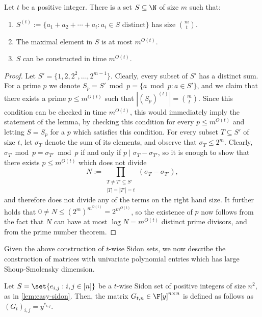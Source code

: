 \begin{lemma}\label{lem:easy-sidon}
Let $t$ be a positive integer. There is a set $S\subseteq\N$ of size $m$ such that:
\begin{enumerate}
\item $S^{(t)}:=\{a_1+a_2+\cdots+a_t:a_i\in S\text{ distinct}\}$ has size $\binom mt$.
\item The maximal element in $S$ is at most $m^{O(t)}$.
\item $S$ can be constructed in time $m^{O(t)}$.
\end{enumerate}
\end{lemma}
\begin{proof}
Let $S'=\{1,2,2^2,\ldots,2^{m-1}\}$. Clearly, every subset of $S'$ has a distinct sum. For a prime $p$ we denote $S_p=S'\bmod p=\{a\bmod p:a\in S'\}$, and we claim that there exists a prime $p\le m^{O(t)}$ such that $|(S_p)^{(t)}|=\binom mt$. Since this condition can be checked in time $m^{O(t)}$, this would immediately imply the statement of the lemma, by checking this condition for every $p\le m^{O(t)}$ and letting $S=S_p$ for a $p$ which satisfies this condition.
For every subset $T\subseteq S'$ of size $t$, let $\sigma_T$ denote the sum of its elements, and observe that $\sigma_T\le2^m$. Clearly, $\sigma_T\bmod p=\sigma_{T'}\bmod p$ if and only if $p\mid\sigma_T-\sigma_{T'}$, so it is enough to show that there exists $p\le m^{O(t)}$ which does not divide
\[N:=\prod_{\substack{T\ne T'\subseteq S'\\|T|=|T'|=t}}(\sigma_T-\sigma_{T'}),\]
and therefore does not divide any of the terms on the right hand size. It further holds that $0\ne N\le(2^m)^{m^{O(t)}}=2^{m^{O(t)}}$, so the existence of $p$ now follows from the fact that $N$ can have at most $\log N=m^{O(t)}$ distinct prime divisors, and from the prime number theorem.
\end{proof}

Given the above construction of $t$-wise Sidon sets, we now describe the construction of matrices with univariate polynomial entries which has large Shoup-Smolensky dimension.

\begin{construction}
\label{con:univariate hard matrix}
Let $S = \set{e_{i, j} : i, j \in [n]}$ be a $t$-wise Sidon set of positive integers of size $n^2$, as in \autoref{lem:easy-sidon}. Then, the matrix $G_{t,n} \in \F[y]^{n \times n}$ is defined as follows as 
$(G_t)_{i, j} = y^{e_{i, j}}$.
\end{construction}

